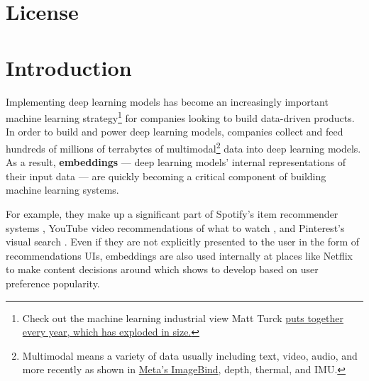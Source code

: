 \documentclass[11pt, table]{diazessay} %
\begin{document}
\begin{sloppypar}
\section*{License}
\doclicenseThis
\newpage

\tableofcontents
\newpage


\section{Introduction}

Implementing deep learning models has become an increasingly important machine learning strategy\footnote{Check out the machine learning industrial view Matt Turck \href{https://mattturck.com/mad2023/}{puts together every year, which has exploded in size.}} for companies looking to build data-driven products. In order to build and power deep learning models, companies collect and feed hundreds of millions of terrabytes of multimodal\footnote{Multimodal means a variety of data usually including text, video, audio, and more recently as shown in \href{https://ai.facebook.com/blog/imagebind-six-modalities-binding-ai/}{Meta's ImageBind}, depth, thermal, and IMU.} data into deep learning models. As a result, \textbf{embeddings} --- deep learning models' internal representations of their input data --- are quickly becoming a critical component of building machine learning systems. 

For example, they make up a significant part of Spotify's item recommender systems \citep{hansen2020contextual}, YouTube video recommendations of what to watch \citep{covington2016deep}, and Pinterest's visual search \citep{jing2015visual}. Even if they are not explicitly presented to the user in the form of recommendations UIs, embeddings are also used internally at places like Netflix to make content decisions around which shows to develop based on user preference popularity. 


\end{sloppypar}
\end{document}
